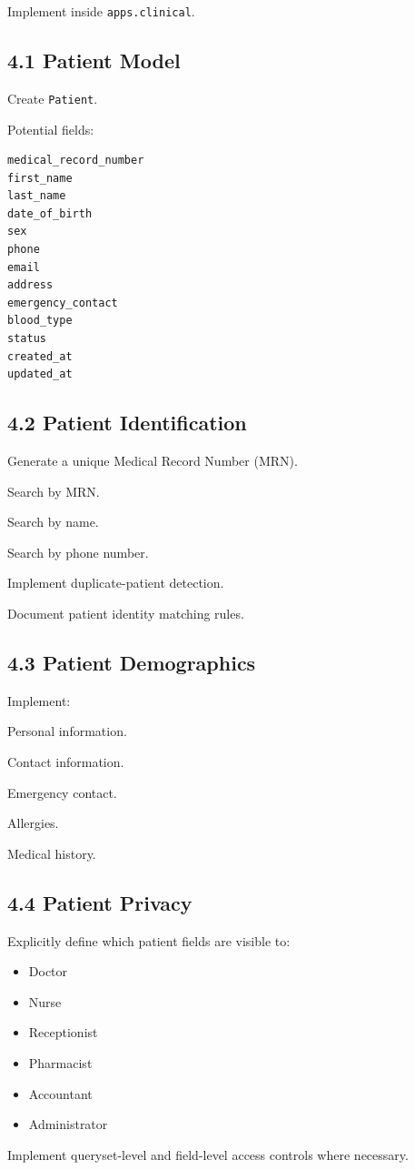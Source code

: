 \documentclass[11pt,a4paper]{article}
\newcommand{\task}[1]{\item[$\square$] #1}
\begin{document}
Implement inside \texttt{apps.clinical}.

\subsection{4.1 Patient Model}

Create \texttt{Patient}.

Potential fields:

\begin{lstlisting}
medical_record_number
first_name
last_name
date_of_birth
sex
phone
email
address
emergency_contact
blood_type
status
created_at
updated_at
\end{lstlisting}

\subsection{4.2 Patient Identification}

\task{Generate a unique Medical Record Number (MRN).}
\task{Search by MRN.}
\task{Search by name.}
\task{Search by phone number.}
\task{Implement duplicate-patient detection.}
\task{Document patient identity matching rules.}

\subsection{4.3 Patient Demographics}

Implement:

\task{Personal information.}
\task{Contact information.}
\task{Emergency contact.}
\task{Allergies.}
\task{Medical history.}

\subsection{4.4 Patient Privacy}

Explicitly define which patient fields are visible to:

\begin{itemize}
    \item Doctor
    \item Nurse
    \item Receptionist
    \item Pharmacist
    \item Accountant
    \item Administrator
\end{itemize}

Implement queryset-level and field-level access controls where necessary.
\end{document}
